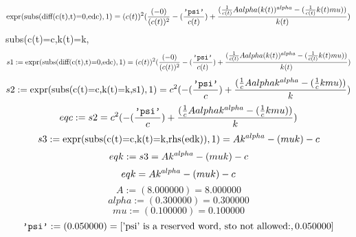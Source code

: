 \documentclass{article}
\begin{document}
\begin{equation} \label{eq:26}
\mbox{expr}(\mbox{subs(diff(c(t),t)=0,edc)},1) = (c(t))^{2}\* (\frac{(-0)}{(c(t))^{2}}-(\frac{\mbox{\tt'psi'}}{c(t)})+\frac{(\frac{1}{c(t)} \* A\* alpha\* (k(t))^{alpha}-(\frac{1}{c(t)} \* k(t)\* mu))}{k(t)})
\end{equation}
subs(c(t)=c,k(t)=k,%
\begin{equation} \label{eq:28}
s1:=\mbox{expr}(\mbox{subs(diff(c(t),t)=0,edc)},1) = (c(t))^{2}\* (\frac{(-0)}{(c(t))^{2}}-(\frac{\mbox{\tt'psi'}}{c(t)})+\frac{(\frac{1}{c(t)} \* A\* alpha\* (k(t))^{alpha}-(\frac{1}{c(t)} \* k(t)\* mu))}{k(t)})
\end{equation}
\begin{equation} \label{eq:29}
s2:=\mbox{expr}(\mbox{subs(c(t)=c,k(t)=k,s1)},1) = c^{2}\* (-(\frac{\mbox{\tt'psi'}}{c})+\frac{(\frac{1}{c} \* A\* alpha\* k^{alpha}-(\frac{1}{c} \* k\* mu))}{k})
\end{equation}
\begin{equation} \label{eq:30}
eqc:=s2 = c^{2}\* (-(\frac{\mbox{\tt'psi'}}{c})+\frac{(\frac{1}{c} \* A\* alpha\* k^{alpha}-(\frac{1}{c} \* k\* mu))}{k})
\end{equation}
\begin{equation} \label{eq:31}
s3:=\mbox{expr}(\mbox{subs(c(t)=c,k(t)=k,rhs(edk))},1) = A\* k^{alpha}-(mu\* k)-c
\end{equation}
\begin{equation} \label{eq:32}
eqk:=s3 = A\* k^{alpha}-(mu\* k)-c
\end{equation}
\begin{equation} \label{eq:33}
eqk = A\* k^{alpha}-(mu\* k)-c
\end{equation}
\begin{equation} \label{eq:34}
A:=(     8.000000) =      8.000000
\end{equation}
\begin{equation} \label{eq:35}
alpha:=(     0.300000) =      0.300000
\end{equation}
\begin{equation} \label{eq:36}
mu:=(     0.100000) =      0.100000
\end{equation}
\begin{equation} \label{eq:37}
\mbox{\tt'psi'}:=(     0.050000) = [\mbox{'psi' is a reserved word, sto not allowed:},     0.050000]
\end{equation}
\end{document}
